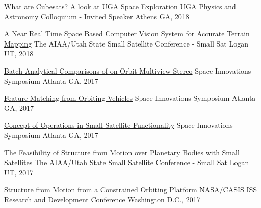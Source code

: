 \documentclass[10pt,a4paper]{article}
\begin{document}
\headedsection
  {{\color{bluegreen} \faTelevision} \href{http://smallsat.uga.edu/}{What are Cubesats? A look at UGA Space Exploration}}{%
  \headedsubsection
    {UGA Physics and Astronomy Colloquium - Invited Speaker}
    {Athens GA, 2018}
    {}
}

\headedsection
  {{\color{bluegreen} \faStickyNoteO} \href{http://smallsat.uga.edu/images/documents/papers/Adams_32nd_SmallSatConference.pdf}{A Near Real Time Space Based Computer Vision System for Accurate Terrain Mapping}}{%
  \headedsubsection
    {The AIAA/Utah State Small Satellite Conference - Small Sat}
    {Logan UT, 2018}
    {}
}

\headedsection
  {{\color{bluegreen} \faTelevision} \href{http://smallsat.uga.edu/images/documents/presentations/Adams,Caleb_Presentation.pdf}{Batch Analytical Comparisons of on Orbit Multiview Stereo}}{%
  \headedsubsection
    {Space Innovations Symposium}
    {Atlanta GA, 2017}
    {}
}

\headedsection
  {{\color{bluegreen} \faMapO} \href{http://smallsat.uga.edu/images/documents/posters/Feature_Matching_from_Orbiting_Vehicles.pdf}{Feature Matching from Orbiting Vehicles}}{%
  \headedsubsection
    {Space Innovations Symposium}
    {Atlanta GA, 2017}
    {}
}

\headedsection
  {{\color{bluegreen} \faMapO} \href{http://smallsat.uga.edu/images/documents/posters/Symposium_for_Space_Innovations_Poster.pdf}{Concept of Operations in Small Satellite Functionality}}{%
  \headedsubsection
    {Space Innovations Symposium}
    {Atlanta GA, 2017}
    {}
}

\headedsection
  {{\color{bluegreen} \faTelevision} \href{http://smallsat.uga.edu/images/documents/presentations/Feasability_of_Structure_from_motion_over_planetary_bodies_using_small_satellites.pdf}{The Feasibility of Structure from Motion over Planetary Bodies with Small Satellites}}{%
  \headedsubsection
    {The AIAA/Utah State Small Satellite Conference - Small Sat}
    {Logan UT, 2017}
    {}
}

\headedsection
  {{\color{bluegreen} \faMapO} \href{http://smallsat.uga.edu/images/documents/posters/Structure_from_Motion_from_a_Constrained_Orbit.pdf}{Structure from Motion from a Constrained Orbiting Platform}}{%
  \headedsubsection
    {NASA/CASIS ISS Research and Development Conference}
    {Washington D.C., 2017}
    {}
}
\end{document}
